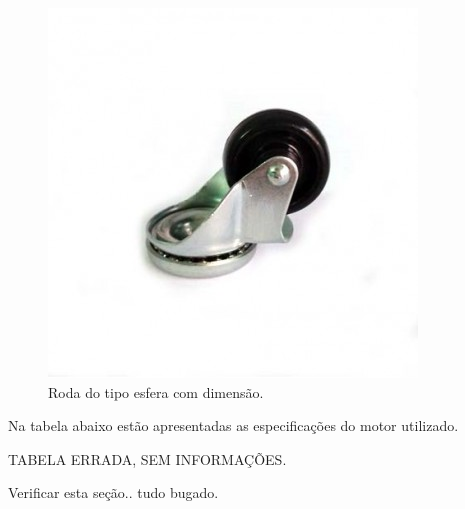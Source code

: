 \begin{figure}[H]
	\centering
	\includegraphics[scale=0.7]{figuras/roda_boba.png}
	\caption{Roda do tipo esfera com dimensão.}
	\label{img:roda_boba}
\end{figure}
	
	Na tabela abaixo estão apresentadas as especificações do motor utilizado.

	TABELA ERRADA, SEM INFORMAÇÕES.

	Verificar esta seção.. tudo bugado.


